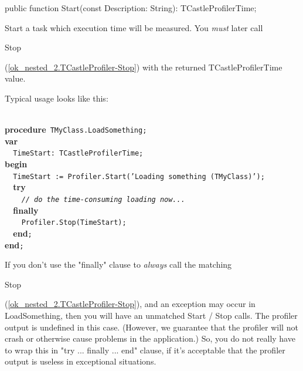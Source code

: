 \documentclass{report}
\newif\ifpdf
\begin{document}
\label{ok_nested_2.TCastleProfiler-Start}
\begin{list}{}{
\setlength{\itemindent}{0cm}
\setlength{\listparindent}{0cm}
\setlength{\leftmargin}{\evensidemargin}
\addtolength{\leftmargin}{\tmplength}
\settowidth{\labelsep}{X}
\addtolength{\leftmargin}{\labelsep}
\setlength{\labelwidth}{\tmplength}
}
\item[\textbf{Declaration}\hfill]
\ifpdf
\begin{flushleft}
\fi
\begin{ttfamily}
public function Start(const Description: String): TCastleProfilerTime;\end{ttfamily}

\ifpdf
\end{flushleft}
\fi

\par
\item[\textbf{Description}]
Start a task which execution time will be measured. You \textit{must} later call \begin{ttfamily}Stop\end{ttfamily}(\ref{ok_nested_2.TCastleProfiler-Stop}) with the returned TCastleProfilerTime value.

Typical usage looks like this:

\texttt{\\\nopagebreak[3]
}\textbf{procedure}\texttt{~TMyClass.LoadSomething;\\\nopagebreak[3]
}\textbf{var}\texttt{\\\nopagebreak[3]
~~TimeStart:~TCastleProfilerTime;\\\nopagebreak[3]
}\textbf{begin}\texttt{\\\nopagebreak[3]
~~TimeStart~:=~Profiler.Start('Loading~something~(TMyClass)');\\\nopagebreak[3]
~~}\textbf{try}\texttt{\\\nopagebreak[3]
~~~~\textit{//~do~the~time-consuming~loading~now...}\\\nopagebreak[3]
~~}\textbf{finally}\texttt{\\\nopagebreak[3]
~~~~Profiler.Stop(TimeStart);\\\nopagebreak[3]
~~}\textbf{end}\texttt{;\\\nopagebreak[3]
}\textbf{end}\texttt{;\\
}

If you don't use the "finally" clause to \textit{always} call the matching \begin{ttfamily}Stop\end{ttfamily}(\ref{ok_nested_2.TCastleProfiler-Stop}), and an exception may occur in LoadSomething, then you will have an unmatched Start / Stop calls. The profiler output is undefined in this case. (However, we guarantee that the profiler will not crash or otherwise cause problems in the application.) So, you do not really have to wrap this in "try ... finally ... end" clause, if it's acceptable that the profiler output is useless in exceptional situations.


\end{list}
\end{document}
